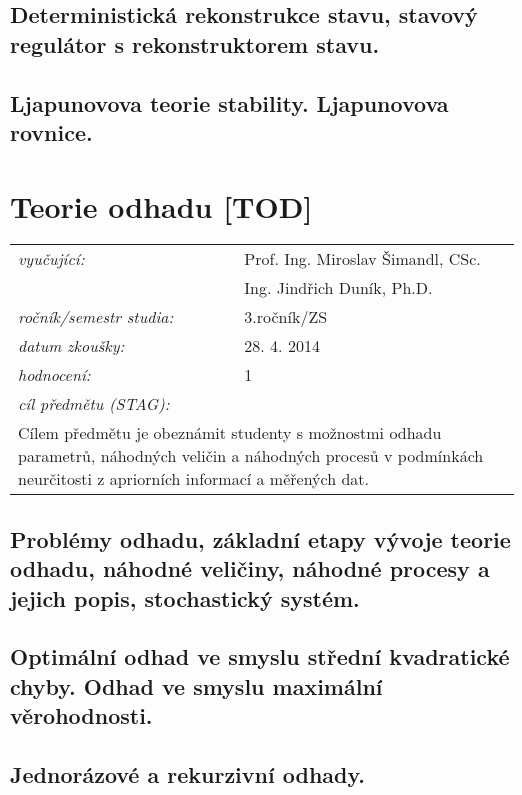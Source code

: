 \subsection{Deterministická rekonstrukce stavu, stavový regulátor s rekonstruktorem stavu.}

\subsection{Ljapunovova teorie stability. Ljapunovova rovnice.}

\section{Teorie odhadu [TOD]}

\begin{table}[H]
\centering
\begin{tabular}{p{4cm} p{12cm}}
\textit{vyučující:}             & Prof. Ing. Miroslav Šimandl, CSc. \\
								 & Ing. Jindřich Duník, Ph.D. \\
\textit{ročník/semestr studia:} & 3.ročník/ZS \\
\textit{datum zkoušky:}         & 28. 4. 2014 \\
\textit{hodnocení:}             & 1 \\
\textit{cíl předmětu (STAG):}   & \\
\multicolumn{2}{p{16cm}}{Cílem předmětu je obeznámit studenty s možnostmi odhadu parametrů, náhodných veličin a náhodných procesů v podmínkách neurčitosti z apriorních informací a měřených dat.}
\end{tabular}
\end{table}

\subsection{Problémy odhadu, základní etapy vývoje teorie odhadu, náhodné veličiny, náhodné procesy a jejich popis, stochastický systém.}

\subsection{Optimální odhad ve smyslu střední kvadratické chyby. Odhad ve smyslu maximální věrohodnosti.}

\subsection{Jednorázové a rekurzivní odhady.}

